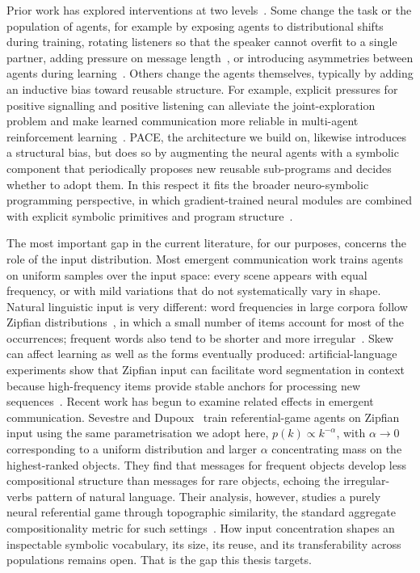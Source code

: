 Prior work has explored interventions at two levels~\cite{kim2021emergent,michel_revisiting_2022,rita_role_2022,chaabouni_emergent_2022,rita_language_2024}. Some change the task or the population of agents, for example by exposing agents to distributional shifts during training, rotating listeners so that the speaker cannot overfit to a single partner, adding pressure on message length~\cite{rita_lazimpa_2020}, or introducing asymmetries between agents during learning~\cite{van_eecke_language_2022}. Others change the agents themselves, typically by adding an inductive bias toward reusable structure. For example, explicit pressures for positive signalling and positive listening can alleviate the joint-exploration problem and make learned communication more reliable in multi-agent reinforcement learning~\cite{eccles_biases_2019}. PACE, the architecture we build on, likewise introduces a structural bias, but does so by augmenting the neural agents with a symbolic component that periodically proposes new reusable sub-programs and decides whether to adopt them. In this respect it fits the broader neuro-symbolic programming perspective, in which gradient-trained neural modules are combined with explicit symbolic primitives and program structure~\cite{chaudhuri_neurosymbolic_2021}.

The most important gap in the current literature, for our purposes, concerns the role of the input distribution. Most emergent communication work trains agents on uniform samples over the input space: every scene appears with equal frequency, or with mild variations that do not systematically vary in shape. Natural linguistic input is very different: word frequencies in large corpora follow Zipfian distributions~\cite{zipf_human_1949}, in which a small number of items account for most of the occurrences; frequent words also tend to be shorter and more irregular~\cite{pinker_words_1999,bybee_frequency_2007,wu_morphological_2019}. Skew can affect learning as well as the forms eventually produced: artificial-language experiments show that Zipfian input can facilitate word segmentation in context because high-frequency items provide stable anchors for processing new sequences~\cite{kurumada_zipfian_2013}. Recent work has begun to examine related effects in emergent communication. Sevestre and Dupoux~\cite{sevestre_frequency_2025} train referential-game agents on Zipfian input using the same parametrisation we adopt here, $p(k) \propto k^{-\alpha}$, with $\alpha \to 0$ corresponding to a uniform distribution and larger $\alpha$ concentrating mass on the highest-ranked objects. They find that messages for frequent objects develop less compositional structure than messages for rare objects, echoing the irregular-verbs pattern of natural language. Their analysis, however, studies a purely neural referential game through topographic similarity, the standard aggregate compositionality metric for such settings~\cite{brighton_understanding_2006}. How input concentration shapes an inspectable symbolic vocabulary, its size, its reuse, and its transferability across populations remains open. That is the gap this thesis targets.

